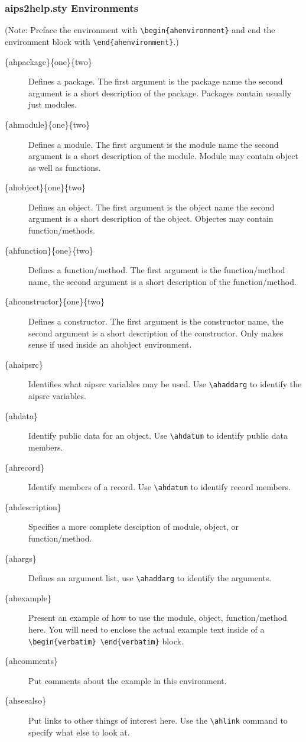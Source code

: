 \subsubsection{aips2help.sty Environments}
(Note: Preface the environment with
\verb!\begin{ahenvironment}!  and end the environment block with 
\verb!\end{ahenvironment}!.)
\begin{description}
\item[\{ahpackage\}\{one\}\{two\}] Defines a package. The first argument
is the package name the second argument is a short description of the package.
Packages contain usually just modules.
\item[\{ahmodule\}\{one\}\{two\}] Defines a module. The first argument
is the module name the second argument is a short description of the module.
Module may contain object as well as functions.
\item[\{ahobject\}\{one\}\{two\}] Defines an object. The first argument
is the object name the second argument is a short description of the
object.  Objectes may contain function/methods.
\item[\{ahfunction\}\{one\}\{two\}] Defines a function/method. The first
argument is the function/method name, the second argument is a short
description of the function/method.
\item[\{ahconstructor\}\{one\}\{two\}] Defines a constructor.  The first
argument is the constructor name, the second argument is a short description
of the constructor.  Only makes sense if used inside an ahobject environment.
\item[\{ahaipsrc\}]Identifies what aipsrc variables may be used.  Use
\verb!\ahaddarg! to identify the aipsrc variables.
\item[\{ahdata\}]Identify public data for an object. Use \verb!\ahdatum! to
identify public data members.
\item[\{ahrecord\}]Identify members of a record.  Use \verb!\ahdatum! to
identify record members.
\item[\{ahdescription\}] Specifies a more complete desciption of module,
object, or function/method.
\item[\{ahargs\}] Defines an argument list, use \verb!\ahaddarg! to identify the
arguments.
\item[\{ahexample\}] Present an example of how to use the module, object,
function/method here.  You will need to enclose the actual example text
inside of a \verb!\begin{verbatim} \end{verbatim}! block.
\item[\{ahcomments\}] Put comments about the example in this environment.
\item[\{ahseealso\}] Put links to other things of interest here.  Use the
\verb!\ahlink! command to specify what else to look at.
\end{description}

